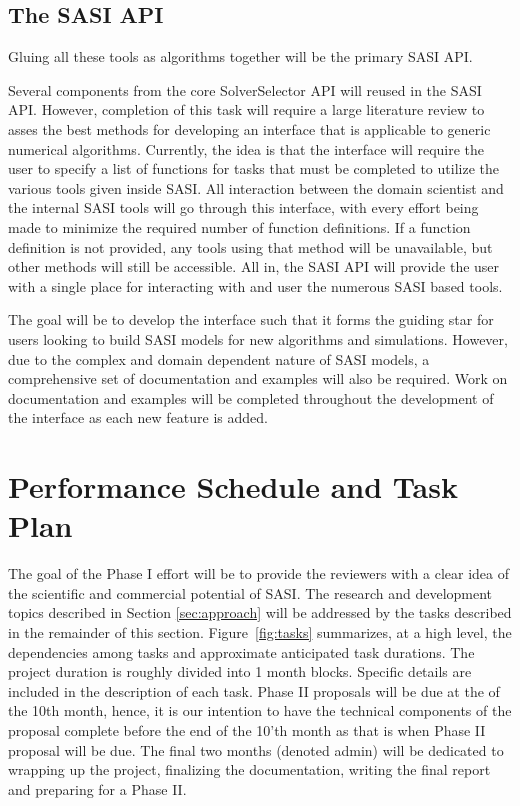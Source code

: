 \subsection{The SASI API} 
Gluing all these tools as algorithms together will be the primary SASI API. 

Several components from the core SolverSelector API will reused in the SASI API. However, completion of this task will require a large literature review to asses the best methods for developing an interface that is applicable to generic numerical algorithms. Currently, the idea is that the interface will require the user to specify a list of functions for tasks that must be completed to utilize the various tools given inside SASI. All interaction between the domain scientist and the internal SASI tools will go through this interface, with every effort being made to minimize the required number of function definitions. If a function definition is not provided, any tools using that method will be unavailable, but other methods will still be accessible. All in, the SASI API will provide the user with a single place for interacting with and user the numerous SASI based tools. 
 
 The goal will be to develop the interface such that it forms the guiding star for users looking to build SASI models for new algorithms and simulations. However, due to the complex and domain dependent nature of SASI models, a comprehensive set of documentation and examples will also be required. Work on documentation and examples will be completed throughout the development of the interface as each new feature is added. 
 
\section{Performance Schedule and Task Plan}
\label{sec:taskplan}

The goal of the Phase I effort will be to provide the reviewers with a clear idea 
of the scientific and commercial potential of SASI. The research and development topics 
described in Section \ref{sec:approach} will be addressed by the tasks described in the remainder of this section. 
Figure~\ref{fig:tasks} summarizes, at a high level, the dependencies among tasks 
and approximate anticipated task durations. The project duration is roughly 
divided into 1 month blocks. Specific details are included in the description 
of each task. Phase II proposals will be due at the of the 10th month, hence, it is our
intention to have the technical components of the proposal complete before the end of 
the 10'th month as that is when Phase II proposal will be due. The final two months (denoted admin) will
be dedicated to wrapping up the project, finalizing the documentation, writing the final 
report and preparing for a Phase II. 

